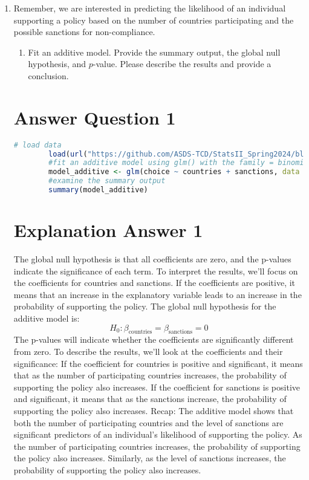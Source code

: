 \documentclass[12pt,letterpaper]{article}
\begin{document}
\begin{enumerate}
	\item
	Remember, we are interested in predicting the likelihood of an individual supporting a policy based on the number of countries participating and the possible sanctions for non-compliance.
	\begin{enumerate}
		\item [] Fit an additive model. Provide the summary output, the global null hypothesis, and $p$-value. Please describe the results and provide a conclusion.
	\end{enumerate}
	
		\section*{Answer Question 1}
	
	\begin{lstlisting}[language=R]
		# load data
		load(url("https://github.com/ASDS-TCD/StatsII_Spring2024/blob/main/datasets/climateSupport.RData?raw=true"))
		#fit an additive model using glm() with the family = binomial()
		model_additive <- glm(choice ~ countries + sanctions, data = climateSupport, family = binomial)
		#examine the summary output
		summary(model_additive)
	\end{lstlisting}
	
	\vspace{.25cm}
	\section*{Explanation Answer 1} 
	\vspace{.25cm}
	\noindent The global null hypothesis is that all coefficients are zero, and the p-values indicate the significance of each term.
	To interpret the results, we'll focus on the coefficients for countries and sanctions. If the coefficients are positive, it means that an increase in the explanatory variable leads to an increase in the probability of supporting the policy.
	The global null hypothesis for the additive model is:
	$$H_0: \beta_{\text{countries}} = \beta_{\text{sanctions}} = 0$$
	The p-values will indicate whether the coefficients are significantly different from zero.
	To describe the results, we'll look at the coefficients and their significance:
	If the coefficient for countries is positive and significant, it means that as the number of participating countries increases, the probability of supporting the policy also increases.
	If the coefficient for sanctions is positive and significant, it means that as the sanctions increase, the probability of supporting the policy also increases.
	Recap:
	The additive model shows that both the number of participating countries and the level of sanctions are significant predictors of an individual's likelihood of supporting the policy. As the number of participating countries increases, the probability of supporting the policy also increases. Similarly, as the level of sanctions increases, the probability of supporting the policy also increases.
		\vspace{.25cm}
		

\end{enumerate}
\end{document}
